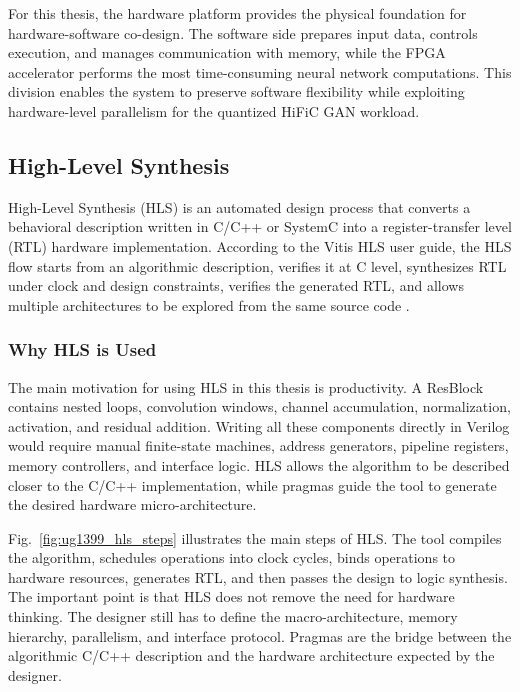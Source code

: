 For this thesis, the hardware platform provides the physical foundation for hardware-software co-design. The software side prepares input data, controls execution, and manages communication with memory, while the FPGA accelerator performs the most time-consuming neural network computations. This division enables the system to preserve software flexibility while exploiting hardware-level parallelism for the quantized HiFiC GAN workload.


\subsection{High-Level Synthesis}

High-Level Synthesis (HLS) is an automated design process that converts a behavioral description written in C/C++ or SystemC into a register-transfer level (RTL) hardware implementation. According to the Vitis HLS user guide, the HLS flow starts from an algorithmic description, verifies it at C level, synthesizes RTL under clock and design constraints, verifies the generated RTL, and allows multiple architectures to be explored from the same source code \cite{amd2026vitisHls}.

\subsubsection{Why HLS is Used}

The main motivation for using HLS in this thesis is productivity. A ResBlock contains nested loops, convolution windows, channel accumulation, normalization, activation, and residual addition. Writing all these components directly in Verilog would require manual finite-state machines, address generators, pipeline registers, memory controllers, and interface logic. HLS allows the algorithm to be described closer to the C/C++ implementation, while pragmas guide the tool to generate the desired hardware micro-architecture.

Fig.~\ref{fig:ug1399_hls_steps} illustrates the main steps of HLS. The tool compiles the algorithm, schedules operations into clock cycles, binds operations to hardware resources, generates RTL, and then passes the design to logic synthesis. The important point is that HLS does not remove the need for hardware thinking. The designer still has to define the macro-architecture, memory hierarchy, parallelism, and interface protocol. Pragmas are the bridge between the algorithmic C/C++ description and the hardware architecture expected by the designer.

